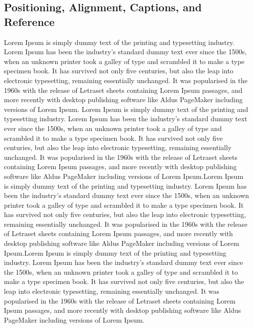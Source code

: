 \documentclass{article}
\begin{document}
    \pagebreak

    \subsection{Positioning, Alignment, Captions, and Reference}

    Lorem Ipsum is simply dummy text of the printing and typesetting industry. Lorem Ipsum has been the industry's standard dummy text ever since the 1500s, when an unknown printer took a galley of type and scrambled it to make a type specimen book. It has survived not only five centuries, but also the leap into electronic typesetting, remaining essentially unchanged. It was popularised in the 1960s with the release of Letraset sheets containing Lorem Ipsum passages, and more recently with desktop publishing software like Aldus PageMaker including versions of Lorem Ipsum. Lorem Ipsum is simply dummy text of the printing and typesetting industry. Lorem Ipsum has been the industry's standard dummy text ever since the 1500s, when an unknown printer took a galley of type and scrambled it to make a type specimen book. It has survived not only five centuries, but also the leap into electronic typesetting, remaining essentially unchanged. It was popularised in the 1960s with the release of Letraset sheets containing Lorem Ipsum passages, and more recently with desktop publishing software like Aldus PageMaker including versions of Lorem Ipsum.Lorem Ipsum is simply dummy text of the printing and typesetting industry. Lorem Ipsum has been the industry's standard dummy text ever since the 1500s, when an unknown printer took a galley of type and scrambled it to make a type specimen book. It has survived not only five centuries, but also the leap into electronic typesetting, remaining essentially unchanged. It was popularised in the 1960s with the release of Letraset sheets containing Lorem Ipsum passages, and more recently with desktop publishing software like Aldus PageMaker including versions of Lorem Ipsum.Lorem Ipsum is simply dummy text of the printing and typesetting industry. Lorem Ipsum has been the industry's standard dummy text ever since the 1500s, when an unknown printer took a galley of type and scrambled it to make a type specimen book. It has survived not only five centuries, but also the leap into electronic typesetting, remaining essentially unchanged. It was popularised in the 1960s with the release of Letraset sheets containing Lorem Ipsum passages, and more recently with desktop publishing software like Aldus PageMaker including versions of Lorem Ipsum.
        
\end{document}
